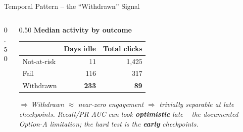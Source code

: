 \documentclass[aspectratio=169,10pt]{beamer}
\newcommand{\hc}[1]{{\bfseries\color{white}#1}}
\newcommand{\takeaway}[1]{\vspace{2pt}\par{\footnotesize\itshape\textcolor{themecol}{$\Rightarrow$\,}#1}}
\begin{document}
\begin{frame}{Temporal Pattern -- the ``Withdrawn'' Signal}
  \begin{columns}[T]
    \begin{column}{0.50\textwidth}
      \centering
    \end{column}
    \begin{column}{0.50\textwidth}
      \footnotesize\textbf{Median activity by outcome}
      {\scriptsize
      \setlength{\tabcolsep}{5pt}\renewcommand{\arraystretch}{1.25}
      \begin{tabularx}{\textwidth}{@{}l r r@{}}
        \toprule
        \rowcolor{themecol}\hc{Outcome} & \hc{Days idle} & \hc{Total clicks}\\
        \midrule
        Not-at-risk & 11  & 1,425\\
        \rowcolor{rowtint}
        Fail        & 116 & 317\\
        Withdrawn   & \textbf{233} & \textbf{89}\\
        \bottomrule
      \end{tabularx}}
      \takeaway{\scriptsize Withdrawn $\approx$ near-zero engagement $\Rightarrow$ trivially separable at \emph{late} checkpoints. Recall/PR-AUC can look \textbf{optimistic} late -- the documented Option-A limitation; the hard test is the \textbf{early} checkpoints.}
    \end{column}
  \end{columns}
\end{frame}
\end{document}
